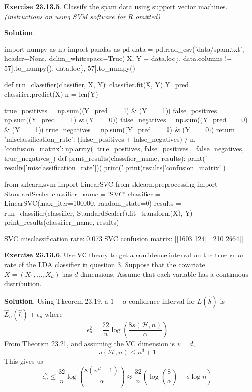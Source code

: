 \textbf{Exercise 23.13.5}. Classify the spam data using support vector
machines.
\emph{(instructions on using SVM software for R omitted)}

\textbf{Solution}.

\begin{python}
import numpy as np
import pandas as pd
data = pd.read_csv('data/spam.txt', header=None, delim_whitespace=True)
X, Y = data.loc[:, data.columns != 57].to_numpy(), data.loc[:, 57].to_numpy()
\end{python}

\begin{python}
def run_classifier(classifier, X, Y):
    classifier.fit(X, Y)
    Y_pred = classifier.predict(X)
    n = len(Y)
    
    true_positives = np.sum((Y_pred == 1) & (Y == 1))
    false_positives = np.sum((Y_pred == 1) & (Y == 0))
    false_negatives = np.sum((Y_pred == 0) & (Y == 1))
    true_negatives = np.sum((Y_pred == 0) & (Y == 0))
    return {
        'misclassification_rate': (false_positives + false_negatives) / n,
        'confusion_matrix': np.array([[true_positives, false_positives], 
                                      [false_negatives, true_negatives]])
    }
def print_results(classifier_name, results):
    print('%
        results['misclassification_rate']))
    print('%
    print(results['confusion_matrix'])
\end{python}

\begin{python}
from sklearn.svm import LinearSVC
from sklearn.preprocessing import StandardScaler
classifier_name = 'SVC'
classifier = LinearSVC(max_{i}ter=100000, random_state=0)
results = run_classifier(classifier, StandardScaler().fit_transform(X), Y)
print_results(classifier_name, results)
\end{python}
\begin{console}
SVC misclassification rate: 0.073
SVC confusion matrix:
[[1603  124]
 [ 210 2664]]
\end{console}

\textbf{Exercise 23.13.6}. Use VC theory to get a confidence interval on
the true error rate of the LDA classifier in question 3. Suppose that
the covariate \(X = (X_{1}, \dots, X_d)\) has \(d\) dimensions. Assume
that each variable has a continuous distribution.

\textbf{Solution}. Using Theorem 23.19, a \(1 - \alpha\) confidence
interval for \(L(\hat{h})\) is \(\hat{L}_{n}(\hat{h}) \pm \epsilon_{n}\)
where
\[
\epsilon_{n}^{2} = \frac{32}{n} \log \left( \frac{8 s(\mathcal{H}, n)}{\alpha} \right)
\]
From Theorem 23.21, and assuming the VC dimension is \(v = d\),
\[
s(\mathcal{H}, n) \leq n^{d} + 1
\]
This gives us
\[
\epsilon_{n}^{2} \leq \frac{32}{n} \log \left( \frac{8 (n^{d} + 1)}{\alpha} \right) \approx \frac{32}{n} \left( \log \left( \frac{8}{\alpha} \right) + d \log n\right)
\]

